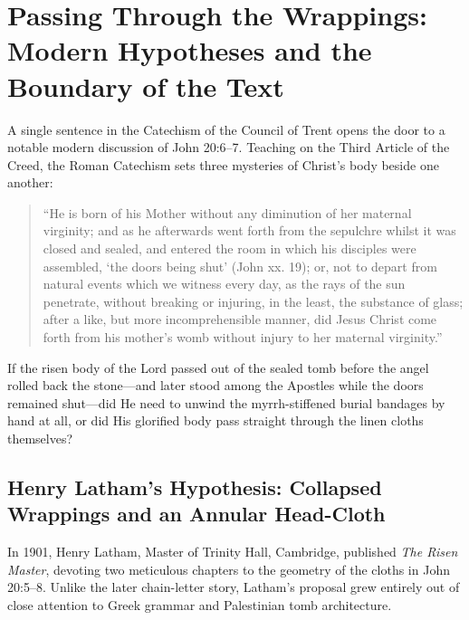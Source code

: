 \section{Passing Through the Wrappings: Modern Hypotheses and the Boundary of the Text}
\label{sec:modern-hypotheses}

A single sentence in the Catechism of the Council of Trent opens the door to a notable modern discussion of John 20:6--7. Teaching on the Third Article of the Creed, the Roman Catechism sets three mysteries of Christ's body beside one another:
\begin{quote}
``He is born of his Mother without any diminution of her maternal virginity; and as he afterwards went forth from the sepulchre whilst it was closed and sealed, and entered the room in which his disciples were assembled, `the doors being shut' (John xx. 19); or, not to depart from natural events which we witness every day, as the rays of the sun penetrate, without breaking or injuring, in the least, the substance of glass; after a like, but more incomprehensible manner, did Jesus Christ come forth from his mother's womb without injury to her maternal virginity.''
\end{quote}

If the risen body of the Lord passed out of the sealed tomb before the angel rolled back the stone---and later stood among the Apostles while the doors remained shut---did He need to unwind the myrrh-stiffened burial bandages by hand at all, or did His glorified body pass straight through the linen cloths themselves?

\subsection{Henry Latham's Hypothesis: Collapsed Wrappings and an Annular Head-Cloth}

In 1901, Henry Latham, Master of Trinity Hall, Cambridge, published \emph{The Risen Master}, devoting two meticulous chapters to the geometry of the cloths in John 20:5--8. Unlike the later chain-letter story, Latham's proposal grew entirely out of close attention to Greek grammar and Palestinian tomb architecture.

